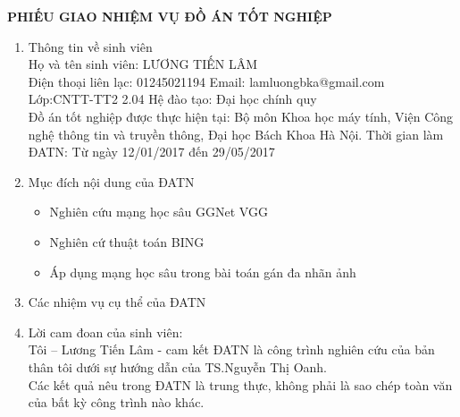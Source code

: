 \documentclass[13pt, a4paper]{extreport}
\begin{document}
\newpage
\begin{center}
{\fontsize{16pt}{19.2}\selectfont \textbf{PHIẾU GIAO NHIỆM VỤ ĐỒ ÁN TỐT NGHIỆP}}
\end{center}	
\begin{enumerate}
  \fontsize{13pt}{15.6}\selectfont
  \item Thông tin về sinh viên \\
   Họ và tên sinh viên: LƯƠNG TIẾN LÂM \\
   Điện thoại liên lạc: 01245021194 \hspace{2cm} Email: lamluongbka@gmail.com \\
   Lớp:CNTT-TT2 2.04 \hspace{4.28cm} Hệ đào tạo: Đại học chính quy \\
   Đồ án tốt nghiệp được thực hiện tại: Bộ môn Khoa học máy tính, Viện Công nghệ thông tin và truyền thông, Đại học Bách Khoa Hà Nội.
  Thời gian làm ĐATN: Từ ngày 12/01/2017 đến 29/05/2017
  \item Mục đích nội dung của ĐATN \\
  \begin{itemize}
    \item Nghiên cứu mạng học sâu GGNet VGG
    \item Nghiên cứ thuật toán BING
    \item Áp dụng mạng học sâu trong bài toán gán đa nhãn ảnh
  \end{itemize}
  \item Các nhiệm vụ cụ thể của ĐATN \\
  \item Lời cam đoan của sinh viên:\\
   Tôi – Lương Tiến Lâm - cam kết ĐATN là công trình nghiên cứu của bản thân tôi dưới sự hướng dẫn của TS.Nguyễn Thị Oanh. \\
   Các kết quả nêu trong ĐATN là trung thực, không phải là sao chép toàn văn của bất kỳ công trình nào khác.
  \begin{flushleft}
    {\fontsize{13pt}{15.6pt}
    }

\end{flushleft}
\end{enumerate}
\end{document}
